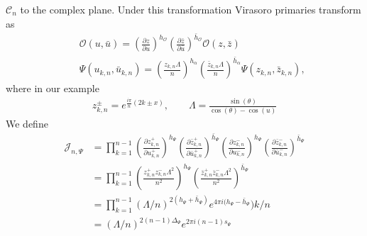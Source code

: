 \documentclass[11pt]{article}
\newcommand{\mO}{\mathcal{O}}
\newcommand{\nn}{\nonumber}
\newcommand{\lb}{\left(}
\newcommand{\rb}{\right)}
\newcommand{\JM}[1]{\textcolor{orange}{#1}}
\begin{document}
  $\mathcal{C}_{n}$ to the complex plane. Under this transformation Virasoro primaries
  transform as
  \begin{eqnarray}
    &&\mO(u,\bar{u})=\lb\frac{\partial z}{\partial u} \rb^{h_\mO}\lb\frac{\partial
    \bar{z}}{\partial\bar{u}}
    \rb^{\bar{h}_\mO}\mO(z,\bar{z})\nn\\
    &&\Psi(u_{k,n},\bar{u}_{k,n})=\lb\frac{z_{k,n}\Lambda}{n}\rb^{h_\alpha}\lb\frac{\bar{z}_{k,n}\Lambda}{n}\rb^{\bar{h}_\alpha}\Psi(z_{k,n},\bar{z}_{k,n}),
  \end{eqnarray}
  where in our example
  \begin{eqnarray}
    z^\pm_{k,n}=e^{\frac{i\pi}{n}(2k\pm x)},\qquad \Lambda=\frac{\sin(\theta)}{\cos(\theta)-\cos(u)}
  \end{eqnarray}
  We define 
  \begin{align}
  \mathcal{J}_{n,\Psi}&=\prod_{k=1}^{n-1}\lb \frac{\partial z^+_{k,n}}{\partial u^+_{k,n}}\rb^{h_\Psi}\lb \frac{\partial \bar{z}^+_{k,n}}{\partial \bar{u}^+_{k,n}}\rb^{\bar{h}_\Psi}\lb \frac{\partial z^-_{k,n}}{\partial u^-_{k,n}}\rb^{h_\Psi}\lb \frac{\partial \bar{z}^-_{k,n}}{\partial \bar{u}^-_{k,n}}\rb^{\bar{h}_\Psi}\nn\\
  &=\prod_{k=1}^{n-1}\lb \frac{z^+_{k,n}z^-_{k,n}\Lambda^2}{n^2}\rb^{h_\Psi}\lb \frac{\bar{z}^+_{k,n}\bar{z}^-_{k,n}\Lambda^2}{n^2}\rb^{\bar{h}_\Psi}\nn\\
  &=\prod_{k=1}^{n-1} (\Lambda/n)^{2(h_\Psi+\bar{h}_\Psi)}e^{4\pi i (h_\Psi-\bar{h}_\Psi})k/n\nn\\
  &=(\Lambda/n)^{2(n-1)\Delta_\Psi}e^{2\pi i(n-1) s_\Psi}
  \end{align}
\end{document}
